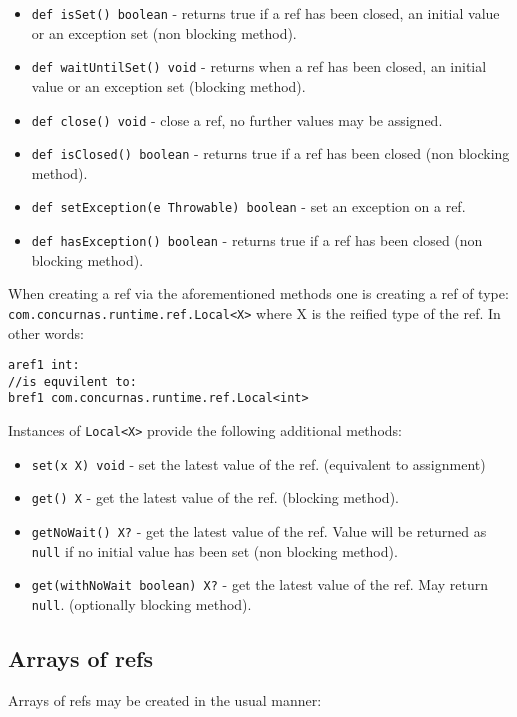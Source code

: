 \documentclass[conc-doc]{subfiles}
\begin{document}
\begin{itemize}
	\item \lstinline{def isSet() boolean} - returns true if a ref has been closed, an initial value or an exception set (non blocking method).
	\item \lstinline{def waitUntilSet() void} - returns when a ref has been closed, an initial value or an exception set (blocking method).
	\item \lstinline{def close() void} - close a ref, no further values may be assigned.
	\item \lstinline{def isClosed() boolean} - returns true if a ref has been closed (non blocking method).
	\item \lstinline{def setException(e Throwable) boolean} - set an exception on a ref.
	\item \lstinline{def hasException() boolean} - returns true if a ref has been closed (non blocking method).
\end{itemize}

\begin{sloppypar}
When creating a ref via the aforementioned methods one is creating a ref of type: \lstinline{com.concurnas.runtime.ref.Local<X>} where X is the reified type of the ref. In other words:

\begin{lstlisting}
aref1 int:
//is equvilent to:
bref1 com.concurnas.runtime.ref.Local<int>
\end{lstlisting}

Instances of \lstinline{Local<X>} provide the following additional methods:
\end{sloppypar}

\begin{itemize}
	\item \lstinline{set(x X) void} - set the latest value of the ref. (equivalent to assignment)
	\item \lstinline{get() X} - get the latest value of the ref. (blocking method).
	\item \lstinline{getNoWait() X?} - get the latest value of the ref. Value will be returned as \lstinline{null} if no initial value has been set (non blocking method).
	\item \lstinline{get(withNoWait boolean) X?} - get the latest value of the ref. May return \lstinline{null}. (optionally blocking method).
\end{itemize}

\subsection{Arrays of refs}
Arrays of refs may be created in the usual manner:
\end{document}
